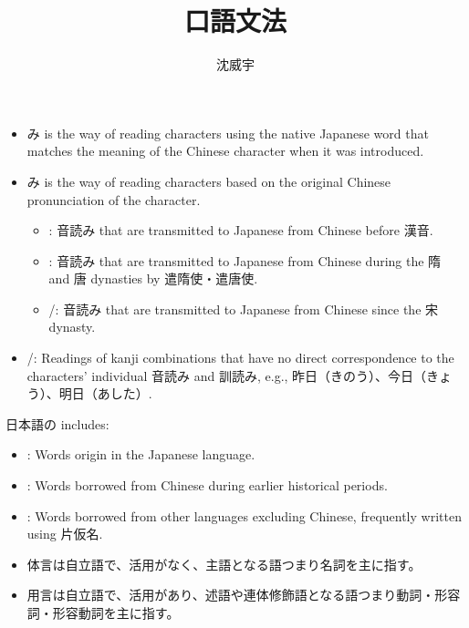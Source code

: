 \documentclass[a4paper,12pt]{article}
\begin{document}
\title{口語文法}
\author{沈威宇}
\date{\temtoday}
\titletocdoc
{}
\begin{itemize}
\item {}み is the way of reading  characters using the native Japanese word that matches the meaning of the Chinese character when it was introduced.
\item {}み is the way of reading  characters based on the original Chinese pronunciation of the character.
\begin{itemize}
\item {}: 音読み that are transmitted to Japanese from Chinese before 漢音.
\item {}: 音読み that are transmitted to Japanese from Chinese during the 隋 and 唐 dynasties by 遣隋使・遣唐使.
\item {}/: 音読み that are transmitted to Japanese from Chinese since the 宋 dynasty.
\end{itemize}
\item {}/: Readings of kanji combinations that have no direct correspondence to the characters' individual 音読み and 訓読み, e.g., 昨日（きのう）、今日（きょう）、明日（あした）.
\end{itemize}
日本語の includes:
\begin{itemize}
\item {}: Words origin in the Japanese language.
\item {}: Words borrowed from Chinese during earlier historical periods.
\item {}: Words borrowed from other languages excluding Chinese, frequently written using 片仮名.
\end{itemize}
\begin{itemize}
\item 体言は自立語で、活用がなく、主語となる語つまり名詞を主に指す。
\item 用言は自立語で、活用があり、述語や連体修飾語となる語つまり動詞・形容詞・形容動詞を主に指す。
\end{itemize}
\end{document}
